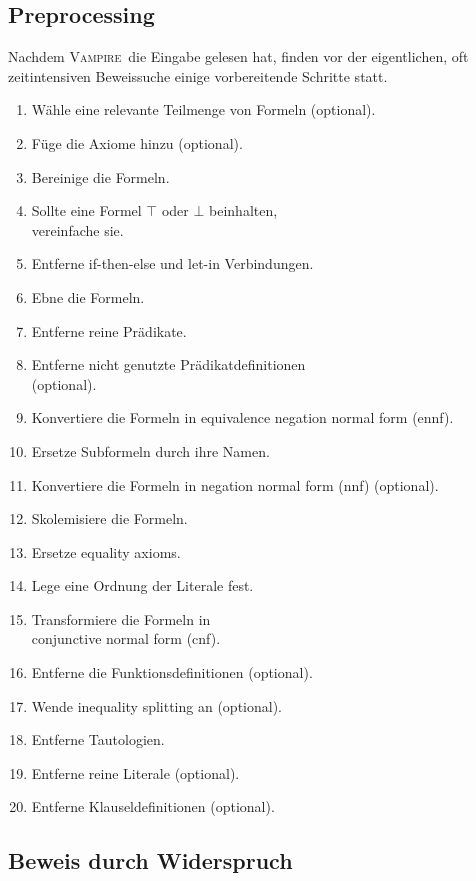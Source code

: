 \documentclass{article}
\newcommand{\vampire}{\textsc{Vampire}~}
\begin{document}
\subsection{Preprocessing}
\label{subsec:preprocessing}

Nachdem \vampire die Eingabe gelesen hat, finden vor der eigentlichen, oft zeitintensiven
Beweissuche einige vorbereitende Schritte statt.

\begin{enumerate}
	\itemsep-0.3em 
	\item Wähle eine relevante Teilmenge von Formeln (optional).
	\item Füge die Axiome hinzu (optional).
	\item Bereinige die Formeln.
	\item Sollte eine Formel $\top$ oder $\bot$ beinhalten, \\vereinfache sie.
	\item Entferne if-then-else und let-in Verbindungen.
	\item Ebne die Formeln.
	\item Entferne reine Prädikate.
	\item Entferne nicht genutzte Prädikatdefinitionen \\(optional).
	\item Konvertiere die Formeln in equivalence negation normal form (ennf).
	\item Ersetze Subformeln durch ihre Namen.
	\item Konvertiere die Formeln in negation normal form (nnf) (optional).
	\item Skolemisiere die Formeln.
	\item Ersetze equality axioms.
	\item Lege eine Ordnung der Literale fest.
	\item Transformiere die Formeln in \\conjunctive normal form (cnf).
	\item Entferne die Funktionsdefinitionen (optional).
	\item Wende inequality splitting an (optional).
	\item Entferne Tautologien.
	\item Entferne reine Literale (optional).
	\item Entferne Klauseldefinitionen (optional).
\end{enumerate}

\subsection{Beweis durch Widerspruch}
\label{subsec:refutation}
\end{document}
